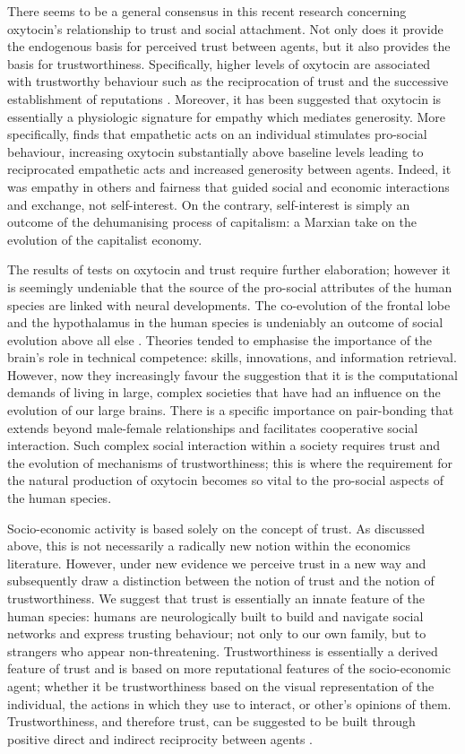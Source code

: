 \begin{subappendices}
There seems to be a general consensus in this recent research concerning oxytocin's relationship to trust and social attachment. Not only does it provide the endogenous basis for perceived trust between agents, but it also provides the basis for trustworthiness. Specifically, higher levels of oxytocin are associated with trustworthy behaviour such as the reciprocation of trust and the successive establishment of reputations \citep{Zak2005}.  Moreover, it has been suggested that oxytocin is essentially a physiologic signature for empathy which mediates generosity. More specifically, \citet{Barraza2009} finds that empathetic acts on an individual stimulates pro-social behaviour, increasing oxytocin substantially above baseline levels leading to reciprocated empathetic acts and increased generosity between agents. Indeed, it was empathy in others and fairness that guided social and economic interactions and exchange, not self-interest. On the contrary, self-interest is simply an outcome of the dehumanising process of capitalism: a Marxian take on the evolution of the capitalist economy.

The results of tests on oxytocin and trust require further elaboration; however it is seemingly undeniable that the source of the pro-social attributes of the human species are linked with neural developments. The co-evolution of the frontal lobe and the hypothalamus in the human species is undeniably an outcome of social evolution above all else \citep{DunbarShultz2007}. Theories tended to emphasise the importance of the brain's role in technical competence: skills, innovations, and information retrieval. However, now they increasingly favour the suggestion that it is the computational demands of living in large, complex societies that have had an influence on the evolution of our large brains. There is a specific importance on pair-bonding that extends beyond male-female relationships and facilitates cooperative social interaction. Such complex social interaction within a society requires trust and the evolution of mechanisms of trustworthiness; this is where the requirement for the natural production of oxytocin becomes so vital to the pro-social aspects of the human species.

Socio-economic activity is based solely on the concept of trust. As discussed above, this is not necessarily a radically new notion within the economics literature. However, under new evidence we perceive trust in a new way and subsequently draw a distinction between the notion of trust and the notion of trustworthiness. We suggest that trust is essentially an innate feature of the human species: humans are neurologically built to build and navigate social networks and express trusting behaviour; not only to our own family, but to strangers who appear non-threatening. Trustworthiness is essentially a derived feature of trust and is based on more reputational features of the socio-economic agent; whether it be trustworthiness based on the visual representation of the individual, the actions in which they use to interact, or other's opinions of them. Trustworthiness, and therefore trust, can be suggested to be built through positive direct and indirect reciprocity between agents \citep{Nowak2005}.


\end{subappendices}

